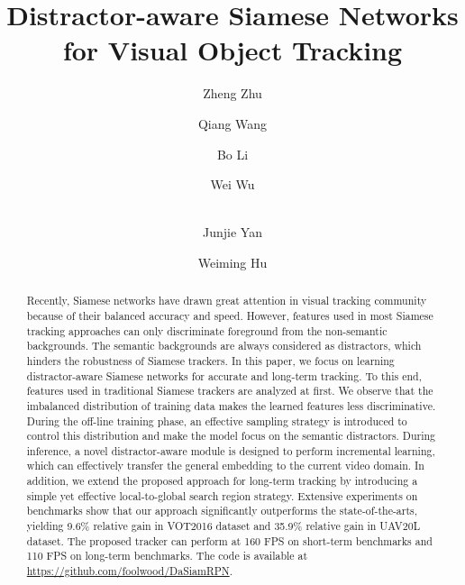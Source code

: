 \documentclass[runningheads]{llncs}
\begin{document}
\title{Distractor-aware Siamese Networks for Visual Object Tracking}




\author{Zheng Zhu \and Qiang Wang \and Bo Li \and Wei Wu \and \\
Junjie Yan \and Weiming Hu}
\maketitle              \begin{abstract}

Recently, Siamese networks have drawn great attention in visual tracking community because of their balanced accuracy and speed.
However, features used in most Siamese tracking approaches can only discriminate foreground from the non-semantic backgrounds.
The semantic backgrounds are always considered as distractors, which hinders the robustness of Siamese trackers.
In this paper, we focus on learning distractor-aware Siamese networks for accurate and long-term tracking.
To this end, features used in traditional Siamese trackers are analyzed at first.
We observe that the imbalanced distribution of training data makes the learned features less discriminative.
During the off-line training phase, an effective sampling strategy is introduced to control this distribution and make the model focus on the semantic distractors.
During inference, a novel distractor-aware module is designed to perform incremental learning, which can effectively transfer the general embedding to the current video domain.
In addition, we extend the proposed approach for long-term tracking by introducing a simple yet effective local-to-global search region strategy.
Extensive experiments on benchmarks show that our approach significantly outperforms the state-of-the-arts, yielding 9.6\% relative gain in VOT2016 dataset and 35.9\% relative gain in UAV20L dataset.
The proposed tracker can perform at 160 FPS on short-term benchmarks and 110 FPS on long-term benchmarks. The code is available at \url{https://github.com/foolwood/DaSiamRPN}.
\end{abstract}
\end{document}
